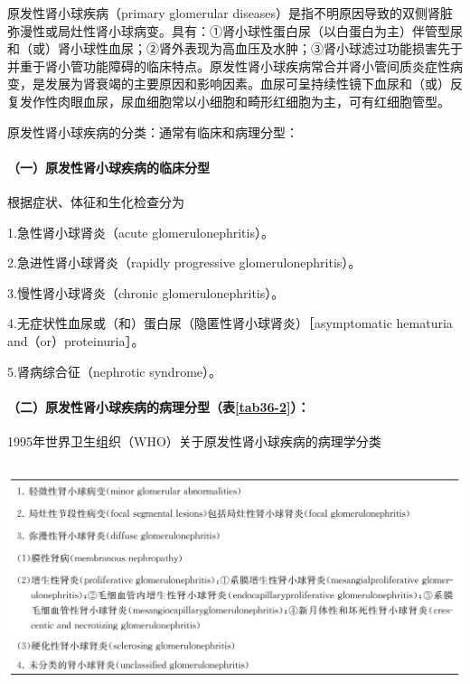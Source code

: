 原发性肾小球疾病（primary glomerular
diseases）是指不明原因导致的双侧肾脏弥漫性或局灶性肾小球病变。具有：①肾小球性蛋白尿（以白蛋白为主）伴管型尿和（或）肾小球性血尿；②肾外表现为高血压及水肿；③肾小球滤过功能损害先于并重于肾小管功能障碍的临床特点。原发性肾小球疾病常合并肾小管间质炎症性病变，是发展为肾衰竭的主要原因和影响因素。血尿可呈持续性镜下血尿和（或）反复发作性肉眼血尿，尿血细胞常以小细胞和畸形红细胞为主，可有红细胞管型。

原发性肾小球疾病的分类：通常有临床和病理分型：

\paragraph{（一）原发性肾小球疾病的临床分型}

根据症状、体征和生化检查分为

1.急性肾小球肾炎（acute glomerulonephritis）。

2.急进性肾小球肾炎（rapidly progressive glomerulonephritis）。

3.慢性肾小球肾炎（chronic glomerulonephritis）。

4.无症状性血尿或（和）蛋白尿（隐匿性肾小球肾炎）［asymptomatic hematuria
and（or）proteinuria］。

5.肾病综合征（nephrotic syndrome）。

\paragraph{（二）原发性肾小球疾病的病理分型（表\ref{tab36-2}）：}

\begin{table}[htbp]
\centering
\caption{1995年世界卫生组织（WHO）关于原发性肾小球疾病的病理学分类}
\label{tab36-2}
\includegraphics[width=5.91667in,height=2.61458in]{./images/Image00225.jpg}
\end{table}

